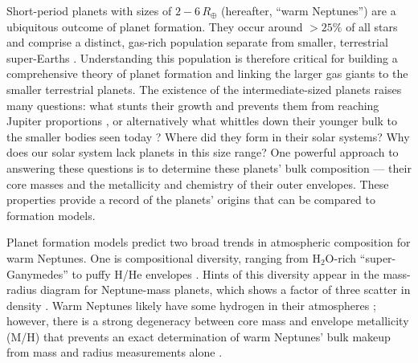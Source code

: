 \documentclass[twocolumn]{aastex61}
\newcommand{\water}{H$_2$O}
\begin{document}
Short-period planets with sizes of $2-6\, R_\oplus$ (hereafter, ``warm
Neptunes'') are a ubiquitous outcome of planet formation. They occur
around $>25\%$ of all stars and comprise a distinct, gas-rich
population separate from smaller, terrestrial super-Earths
\citep[e.g.,][]{buchhave:2014,fulton:2017}. Understanding this
population is therefore critical for building a comprehensive theory
of planet formation and linking the larger gas giants to the smaller
terrestrial planets. The existence of the intermediate-sized planets
raises many questions: what stunts their growth and prevents them from
reaching Jupiter proportions \citep{pollack:1996, lambrechts:2014,
  lee:2016}, or alternatively what whittles down their younger bulk to
the smaller bodies seen today \citep{owen:2013,jin:2017}?  Where did
they form in their solar systems?  Why does our solar system lack
planets in this size range?  One powerful approach to answering these
questions is to determine these planets' bulk composition --- their
core masses and the metallicity and chemistry of their outer
envelopes. These properties provide a record of the planets' origins
that can be compared to formation models.

Planet formation models predict two broad trends in atmospheric composition for warm Neptunes. One is compositional diversity, ranging from \water-rich ``super-Ganymedes'' to puffy H/He envelopes  \citep[][]{elkins-tanton:2008,fortney:2013}. Hints of this diversity appear in the mass-radius diagram for Neptune-mass planets, which shows a factor of three scatter in density \citep[][]{weiss:2014}.  Warm Neptunes likely have some hydrogen in their atmospheres \citep[][]{wolfgang:2015, rogers:2015planet}; however, there is a strong degeneracy between core mass and envelope metallicity (M/H) that prevents an exact determination of warm Neptunes' bulk makeup from mass and radius measurements alone \citep{figueira:2009,miller-ricci:2010, rogers:2011}.



\end{document}
